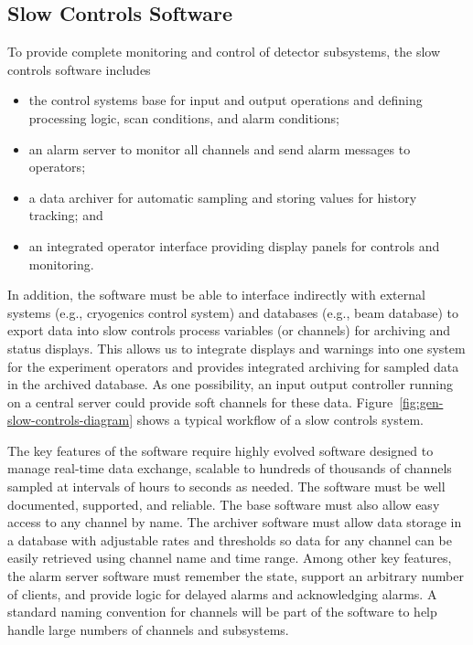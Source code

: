 \subsection{Slow Controls Software}
\label{sec:fdgen-slow-cryo-sw}

To provide complete monitoring and control of detector subsystems, the slow controls software includes
%
\begin{itemize}
 \item the control systems base for input and output operations
  and defining processing logic, scan conditions, and alarm conditions;
 \item an alarm server to monitor all channels and send alarm
  messages to operators;
 \item a data archiver for automatic sampling and storing values for history tracking; and 
 \item an integrated operator interface providing display panels for
  controls and monitoring.
\end{itemize}

In addition, the software must be able to 
interface indirectly with external systems (e.g., cryogenics control
system) and databases (e.g., beam database) to export data into
slow controls process variables (or channels) for archiving and status
displays. This allows us to integrate displays and warnings into one
system for the experiment operators and %
provides integrated
archiving for sampled data in the archived database. As one possibility, an input output controller running on a central 
server could provide soft channels for these data.
Figure~\ref{fig:gen-slow-controls-diagram} shows a typical workflow of a
slow controls system.

The key features of the software require highly evolved software designed to manage real-time data exchange, scalable
to hundreds of thousands of channels sampled at intervals of hours to seconds as needed. The software
must be well documented, supported, and reliable. The base
software must also allow easy access to any channel by name. The
archiver software must allow data storage in a database with
adjustable rates and thresholds so data
for any channel can be easily retrieved using channel name and time range. Among other key
features, the alarm server software must remember the state, support an
arbitrary number of clients, and provide logic for delayed alarms and
acknowledging alarms. A standard naming
convention for channels will be part of the software to help handle large
numbers of channels and subsystems.

